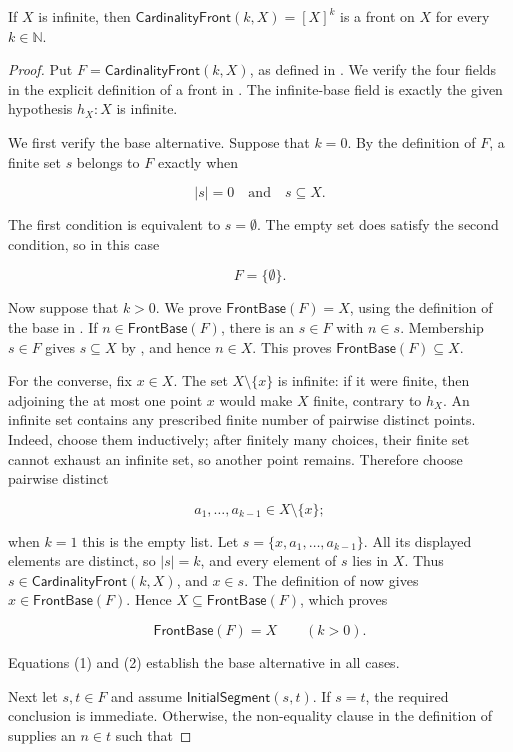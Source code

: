 \begin{lemma}
If $X$ is infinite, then $\mathsf{CardinalityFront}(k,X)=[X]^k$ is a
front on $X$ for every $k\in\mathbb N$.
\end{lemma}
\begin{proof}
Put $F=\mathsf{CardinalityFront}(k,X)$, as defined in
.  We verify the four fields in the explicit
definition of a front in .  The infinite-base field is
exactly the given hypothesis $h_X:X$ is infinite.

We first verify the base alternative.  Suppose that $k=0$.  By the
definition of $F$, a finite set $s$ belongs to $F$ exactly when

\[
|s|=0\quad\text{and}\quad s\subseteq X.
\]

The first condition is equivalent to $s=\emptyset$.  The empty set does
satisfy the second condition, so in this case

\[
F=\{\emptyset\}.
\tag{1}
\]

Now suppose that $k>0$.  We prove
$\mathsf{FrontBase}(F)=X$, using the definition of the base in
.  If $n\in\mathsf{FrontBase}(F)$, there is an
$s\in F$ with $n\in s$.  Membership $s\in F$ gives $s\subseteq X$ by
, and hence $n\in X$.  This proves
$\mathsf{FrontBase}(F)\subseteq X$.

For the converse, fix $x\in X$.  The set $X\setminus\{x\}$ is infinite:
if it were finite, then adjoining the at most one point $x$ would make
$X$ finite, contrary to $h_X$.  An infinite set contains any prescribed
finite number of pairwise distinct points.  Indeed, choose them
inductively; after finitely many choices, their finite set cannot exhaust
an infinite set, so another point remains.  Therefore choose pairwise
distinct

\[
a_1,\ldots,a_{k-1}\in X\setminus\{x\};
\]

when $k=1$ this is the empty list.  Let
$s=\{x,a_1,\ldots,a_{k-1}\}$.  All its displayed elements are distinct,
so $|s|=k$, and every element of $s$ lies in $X$.  Thus
$s\in\mathsf{CardinalityFront}(k,X)$, and $x\in s$.  The definition of
 now gives
$x\in\mathsf{FrontBase}(F)$.  Hence $X\subseteq\mathsf{FrontBase}(F)$,
which proves

\[
\mathsf{FrontBase}(F)=X\qquad(k>0).
\tag{2}
\]

Equations (1) and (2) establish the base alternative in all cases.

Next let $s,t\in F$ and assume
$\mathsf{InitialSegment}(s,t)$.  If $s=t$, the required conclusion is
immediate.  Otherwise, the non-equality clause in the definition of
 supplies an $n\in t$ such that


\end{proof}
